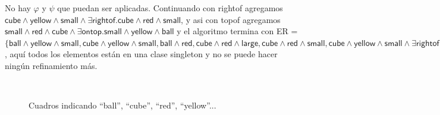 No hay
$\varphi$ y $\psi$ que puedan ser aplicadas. Continuando con \textsf{rightof} agregamos $\textsf{cube} \wedge \textsf{yellow} \wedge \textsf{small} \wedge \exists \textsf{rightof}. \textsf{cube} \wedge \textsf{red} \wedge \textsf{small}$, y asi con \textsf{topof} agregamos $\textsf{small} \wedge \textsf{red} \wedge \textsf{cube} \wedge \exists \textsf{ontop}. \textsf{small} \wedge \textsf{yellow} \wedge \textsf{ball}$ y el algoritmo termina con ER = $\{\textsf{ball} \wedge \textsf{yellow} \wedge \textsf{small}, \textsf{cube} \wedge \textsf{yellow} \wedge \textsf{small}, \textsf{ball} \wedge \textsf{red}, \textsf{cube} \wedge \textsf{red} \wedge \textsf{large}, \textsf{cube} \wedge \textsf{red} \wedge \textsf{small}, \textsf{cube} \wedge \textsf{yellow} \wedge \textsf{small} \wedge \exists \textsf{rightof}. \textsf{cube} \wedge \textsf{red} \wedge \textsf{small}, \textsf{small} \wedge \textsf{red} \wedge \textsf{cube} \wedge \exists \textsf{ontop}. \textsf{small} \wedge \textsf{yellow} \wedge \textsf{ball}\}$, 
aqu\'i todos los elementos est\'an en una clase singleton y no se puede hacer ning\'un refinamiento m\'as. 


\begin{figure}[ht]
\begin{center}
\\[0pt]
\caption{Cuadros indicando ``ball'', ``cube'', ``red'', ``yellow''...}
\label{fig-modelo16}
\end{center}
\end{figure}

